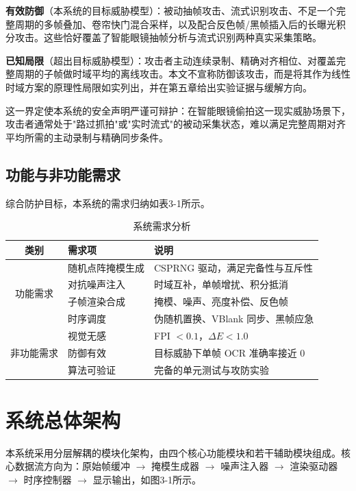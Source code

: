 \textbf{有效防御}（本系统的目标威胁模型）：被动抽帧攻击、流式识别攻击、不足一个完整周期的多帧叠加、卷帘快门混合采样，以及配合反色帧/黑帧插入后的长曝光积分攻击。这些恰好覆盖了智能眼镜抽帧分析与流式识别两种真实采集策略。

\textbf{已知局限}（超出目标威胁模型）：攻击者主动连续录制、精确对齐相位、对覆盖完整周期的子帧做时域平均的离线攻击。本文不宣称防御该攻击，而是将其作为线性时域方案的原理性局限如实列出，并在第五章给出实验证据与缓解方向。

这一界定使本系统的安全声明严谨可辩护：在智能眼镜偷拍这一现实威胁场景下，攻击者通常处于"路过抓拍"或"实时流式"的被动采集状态，难以满足完整周期对齐平均所需的主动录制与精确同步条件。

\subsection{功能与非功能需求}

综合防护目标，本系统的需求归纳如表3-1所示。

\begin{table}[htbp]
  \centering
  \caption{系统需求分析}
  \begin{tabular}{cll}
    \toprule
    类别 & 需求项 & 说明 \\
    \midrule
    \multirow{4}{*}{功能需求}
      & 随机点阵掩模生成 & CSPRNG 驱动，满足完备性与互斥性 \\
      & 对抗噪声注入 & 时域互补，单帧增扰、积分抵消 \\
      & 子帧渲染合成 & 掩模、噪声、亮度补偿、反色帧 \\
      & 时序调度 & 伪随机置换、VBlank 同步、黑帧应急 \\
    \midrule
    \multirow{3}{*}{非功能需求}
      & 视觉无感 & FPI $<0.1$，$\Delta E<1.0$ \\
      & 防御有效 & 目标威胁下单帧 OCR 准确率接近 0 \\
      & 算法可验证 & 完备的单元测试与攻防实验 \\
    \bottomrule
  \end{tabular}
\end{table}

\section{系统总体架构}

本系统采用分层解耦的模块化架构，由四个核心功能模块和若干辅助模块组成。核心数据流方向为：原始帧缓冲 $\rightarrow$ 掩模生成器 $\rightarrow$ 噪声注入器 $\rightarrow$ 渲染驱动器 $\rightarrow$ 时序控制器 $\rightarrow$ 显示输出，如图3-1所示。

